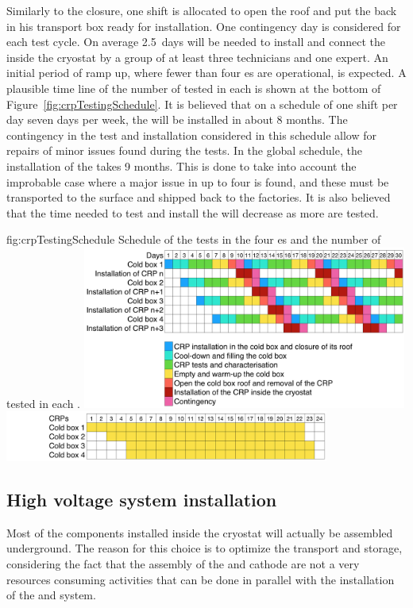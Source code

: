 Similarly to the  \coldbox closure, one shift is allocated to open the roof and put the  back in his transport box ready for installation.
One contingency day is considered for each  \coldbox test cycle.
On average 2.5~days will be needed to install and connect the  inside the cryostat by a group of at least three technicians and one  expert.
An initial period of ramp up, where fewer than four  \coldbox{}es are operational, is expected.
A plausible time line of the number of  tested in each  \coldbox is shown at the bottom of Figure~\ref{fig:crpTestingSchedule}.
It is believed that on a schedule of one shift per day seven days per week, the  will be installed in about 8 months.
The contingency in the test and installation considered in this schedule allow for repairs of minor issues found during the tests.
In the global schedule, the installation of the  takes 9 months.
This is done to take into account the improbable case where a major issue in up to four  is found, and these  must be transported to the surface and shipped back to the factories.
It is also believed that the time needed to test and install the  will decrease as more  are tested.

\begin{dunefigure}{fig:crpTestingSchedule}
{Schedule of the  tests in the four  \coldbox{}es and the number of  tested in each  \coldbox.}
\includegraphics[width=0.8\textwidth]{graphics/crpTestingSchedule.png}
\includegraphics[width=0.8\textwidth]{graphics/crpTestDeliveries.png}
\end{dunefigure}


\subsection{High voltage system installation}
Most of the  components installed inside the cryostat will actually be assembled underground.
The reason for this choice is to optimize the transport and storage, considering the fact that the assembly of the  and cathode are not a very resources consuming activities that can be done in parallel with the installation of the  and  system.

